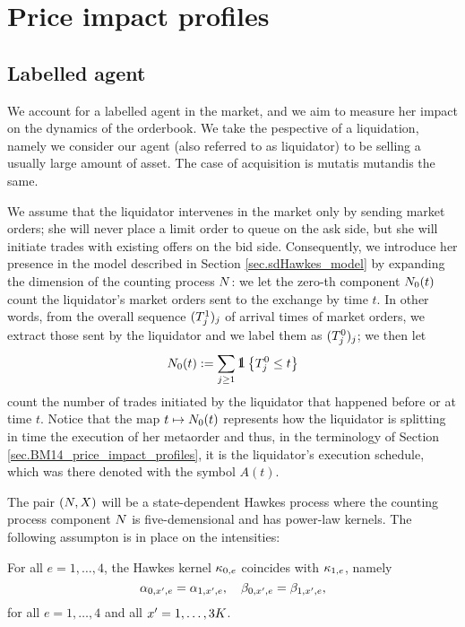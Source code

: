 \documentclass[10pt]{article}
\begin{document}
\section{Price impact profiles}\label{sec.price_impact_profiles}
\subsection{Labelled agent}
We account for a labelled agent in the market, and we aim to measure her impact on the dynamics of the orderbook. We take the pespective of a liquidation, namely we consider our agent (also referred to as liquidator) to be selling a usually large amount of asset. The case of acquisition is mutatis mutandis the same. 

We assume that the liquidator intervenes in the market only by sending market orders; she will never place a limit order to queue on the ask side, but she will initiate trades with existing offers on the bid side. Consequently, we introduce her presence in the model described in Section \ref{sec.sdHawkes_model} by expanding the dimension of the counting process $\multiCountingProc$: we let the zero-th component $\countingProc[0](t)$ count the liquidator's market orders sent to the exchange by time $t$. In other words, from the overall sequence $(\arrivalTimes[1]_j)_j$ of arrival times of market orders, we extract those sent by the liquidator and we label them as $(\arrivalTimes[0]_j)_j$; we then let 
\begin{equation*}
 \countingProc[0](t):=\sum_{j\geq 1}\one \left\lbrace \arrivalTimes[0]_j \leq t \right\rbrace
\end{equation*}
count the number of trades initiated by the liquidator that happened before or at time $t$. Notice that the map $t\mapsto \countingProc[0](t)$ represents how the liquidator is splitting in time the execution of her metaorder and thus, in the terminology of Section \ref{sec.BM14_price_impact_profiles}, it is the liquidator's execution schedule, which was there denoted with the symbol $A(t)$.

The pair $(\multiCountingProc, \stateVariable)$ will be a state-dependent Hawkes process where the counting process component $\multiCountingProc$ is five-demensional and has power-law kernels. The following assumpton is in place on the intensities:
\begin{assumption}\label{assumption.imp_and_dec_coef_from_liquidator}
 For all $e=1,\dots,4$, the Hawkes kernel $\hawkesKernel_{0,e}$ coincides with  $\hawkesKernel_{1,e}$, namely
 \begin{equation*}
  \impCoef_{0,\xone,e}=\impCoef_{1,\xone,e} , \quad \decCoef_{0,\xone,e}= \decCoef_{1,\xone,e}, 
 \end{equation*}
for all $e=1,\dots,4$ and all $\xone = 1,\dots, 3K$. 
\end{assumption}
\end{document}
